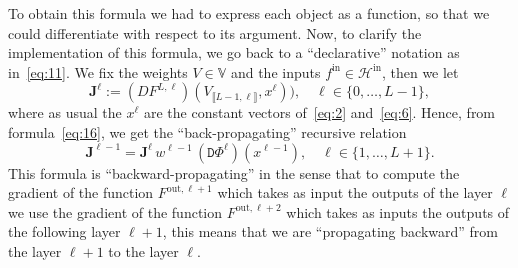 \documentclass[10pt, a4paper]{article}
\theoremstyle{plain}
\theoremstyle{definition}
\theoremstyle{definition}
\theoremstyle{definition}
\theoremstyle{definition}
\theoremstyle{definition}
\theoremstyle{definition}
\theoremstyle{definition}
\theoremstyle{remark}
\theoremstyle{remark}
\theoremstyle{rudin-style-generic}
\theoremstyle{rudin-style-generic*}
\theoremstyle{rudin-style-theorem}
\newcommand*{\fin}{{f^{\text{in}}}}
\begin{document}
  
  To obtain this formula we had to express each object as a function, so that we could differentiate with respect to its argument.
  Now, to clarify the implementation of this formula, we go back to a ``declarative'' notation as in~\eqref{eq:11}.
  We fix the weights $V\in\mathbb V$ and the inputs $\fin\in\mathcal H^{\text{in}}$, then we let
  \begin{equation}\label{eq:17}
    \mathbf J^{\ell} := (D F^{L,\ell})(V_{\llbracket L - 1 , \ell  \rrbracket } , x^{\ell} ) )
    ,
    \quad\ell\in\{0,\dots,L-1\}
    ,
  \end{equation}
  where as usual the $x^{\ell}$ are the constant vectors of~\eqref{eq:2} and~\eqref{eq:6}. 
  Hence, from formula~\eqref{eq:16}, we get the ``back-propagating'' recursive relation
  \begin{equation}\label{eq:18}
    \mathbf J^{\ell-1}  =   \mathbf J^{\ell}  \, w^{\ell-1} \,(\mathtt D\Phi^{\ell})(x^{\ell-1}),
    \quad \ell\in\{1,\dots,L+1\}
    .
  \end{equation}
  This formula is ``backward-propagating'' in the sense that to compute the gradient of the function $F^{\text{out},\ell+1}$
  which takes as input the outputs of the layer $\ell$ we use the gradient of the function $F^{\text{out},\ell+2}$
  which takes as inputs the outputs of the following layer $\ell+1$, this means that we are ``propagating backward''
  from the layer $\ell+1$ to the layer $\ell$.
  
\end{document}
